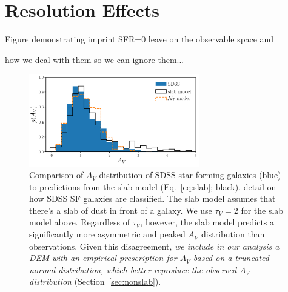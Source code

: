 \section{Resolution Effects} \label{sec:res}

Figure demonstrating imprint SFR=0 leave on the observable space and 

how we deal with them so we can ignore them...

\begin{figure}
    \begin{center}
        \includegraphics[width=0.66\textwidth]{figs/slab_tnorm.pdf} 
        \caption{Comparison of $A_V$ distribution of SDSS star-forming
        galaxies (blue) to predictions from the slab model (Eq.~\ref{eq:slab};
        black). {\color{red} detail on how SDSS SF galaxies are classified.} 
        The slab model assumes that there's a slab of dust in front of a galaxy.
        We use $\tau_V=2$ for the slab model above. Regardless of $\tau_V$,
        however, the slab model predicts a significantly more asymmetric and peaked $A_V$ distribution
        than observations. Given this disagreement, {\em we include in our
        analysis a DEM with an empirical prescription for $A_V$ based on a truncated normal 
        distribution, which better reproduce the observed $A_V$ distribution} (Section~\ref{sec:nonslab}). }
        \label{fig:av_dist}
    \end{center}
\end{figure}

